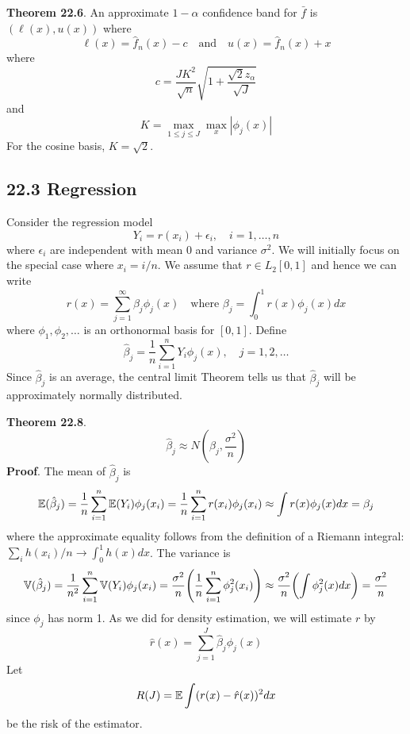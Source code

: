 \textbf{Theorem 22.6}. An approximate \(1 - \alpha\) confidence band for
\(\bar{f}\) is \((\ell(x), u(x))\) where
\[
\ell(x) = \hat{f}_{n}(x) - c
\quad \text{and} \quad
u(x) = \hat{f}_{n}(x) + x
\]
where
\[
c = \frac{JK^{2}}{\sqrt{n}} \sqrt{1 + \frac{\sqrt{2} z_{\alpha}}{\sqrt{J}}}
\]
and
\[
K = \max_{1 \leq j \leq J} \max_x | \phi_{j}(x) |
\]
For the cosine basis, \(K = \sqrt{2}\).

\subsection*{22.3 Regression}\label{regression}
Consider the regression model
\[
Y_{i} = r(x_{i}) + \epsilon_{i}, \quad i = 1, \dots, n
\]
where \(\epsilon_{i}\) are independent with mean 0 and variance
\(\sigma^{2}\). We will initially focus on the special case where
\(x_{i} = i / n\). We assume that \(r \in L_{2}[0, 1]\) and hence we can
write
\[
r(x) = \sum_{j=1}^{\infty} \beta_{j} \phi_{j}(x)
\quad \text{where } \beta_{j} = \int_{0}^{1} r(x) \phi_{j}(x) dx
\]
where \(\phi_{1}, \phi_{2}, \dots\) is an orthonormal basis for \([0, 1]\).
Define
\[
\hat{\beta}_{j} = \frac{1}{n} \sum_{i=1}^{n} Y_{i} \phi_{j}(x), 
\quad j = 1, 2, \dots
\]
Since \(\hat{\beta}_{j}\) is an average, the central limit Theorem tells
us that \(\hat{\beta}_{j}\) will be approximately normally distributed.

\textbf{Theorem 22.8}.
\[
\hat{\beta}_{j} \approx N \left( \beta_{j}, \frac{\sigma^{2}}{n} \right)
\]
\textbf{Proof}. The mean of \(\hat{\beta}_{j}\) is
\[
\operatorname{\mathbb{E}}(\hat{\beta}_{j}) = \frac{1}{n} \sum_{i=1}^{n} \operatorname{\mathbb{E}}(Y_{i}) \phi_{j}(x_{i}) = \frac{1}{n} \sum_{i=1}^{n} r(x_{i}) \phi_{j}(x_{i}) \approx \int r(x) \phi_{j}(x) dx = \beta_{j}
\]
where the approximate equality follows from the definition of a Riemann
integral: \(\sum_{i} h(x_{i}) / n \rightarrow \int_{0}^{1} h(x) dx\).
The variance is
\[
\VAR(\hat{\beta}_{j}) = \frac{1}{n^{2}} \sum_{i=1}^{n} \VAR(Y_{i}) \phi_{j}(x_{i}) = \frac{\sigma^{2}}{n} \left( \frac{1}{n} \sum_{i=1}^{n} \phi_{j}^{2}(x_{i}) \right) \approx \frac{\sigma^{2}}{n} \left( \int \phi_{j}^{2}(x) dx \right) = \frac{\sigma^{2}}{n}
\]
since \(\phi_{j}\) has norm 1.
As we did for density estimation, we will estimate \(r\) by
\[
\hat{r}(x) = \sum_{j=1}^J \hat{\beta}_{j} \phi_{j}(x)
\]
Let
\[
R(J) = \operatorname{\mathbb{E}} \int (r(x) - \hat{r}(x))^{2} dx
\]
be the risk of the estimator.

